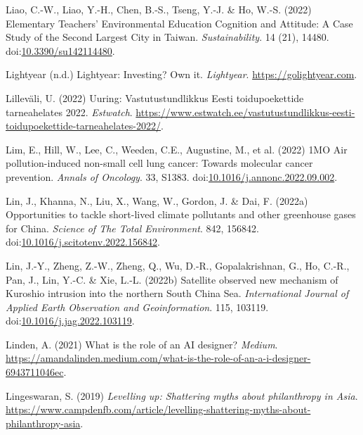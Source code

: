 \documentclass[
  letterpaper,
  DIV=11,
  numbers=noendperiod]{scrartcl}
\newlength{\cslhangindent}
\newenvironment{CSLReferences}[2] %
 {\begin{list}{}{%
  \setlength{\itemindent}{0pt}
  \setlength{\leftmargin}{0pt}
  \setlength{\parsep}{0pt}
  \ifodd #1
   \setlength{\leftmargin}{\cslhangindent}
   \setlength{\itemindent}{-1\cslhangindent}
  \fi
  \setlength{\itemsep}{#2\baselineskip}}}
 {\end{list}}
\begin{document}
\begin{CSLReferences}{0}{1}
Liao, C.-W., Liao, Y.-H., Chen, B.-S., Tseng, Y.-J. \& Ho, W.-S. (2022)
Elementary {Teachers}' {Environmental Education Cognition} and
{Attitude}: {A Case Study} of the {Second Largest City} in {Taiwan}.
\emph{Sustainability}. 14 (21), 14480.
doi:\href{https://doi.org/10.3390/su142114480}{10.3390/su142114480}.

Lightyear (n.d.) Lightyear: {Investing}? {Own} it. \emph{Lightyear}.
\url{https://golightyear.com}.

Lilleväli, U. (2022) Uuring: {Vastutustundlikkus Eesti} toidupoekettide
tarneahelates 2022. \emph{Estwatch}.
\url{https://www.estwatch.ee/vastutustundlikkus-eesti-toidupoekettide-tarneahelates-2022/}.

Lim, E., Hill, W., Lee, C., Weeden, C.E., Augustine, M., et al. (2022)
{1MO Air} pollution-induced non-small cell lung cancer: {Towards}
molecular cancer prevention. \emph{Annals of Oncology}. 33, S1383.
doi:\href{https://doi.org/10.1016/j.annonc.2022.09.002}{10.1016/j.annonc.2022.09.002}.

Lin, J., Khanna, N., Liu, X., Wang, W., Gordon, J. \& Dai, F. (2022a)
Opportunities to tackle short-lived climate pollutants and other
greenhouse gases for {China}. \emph{Science of The Total Environment}.
842, 156842.
doi:\href{https://doi.org/10.1016/j.scitotenv.2022.156842}{10.1016/j.scitotenv.2022.156842}.

Lin, J.-Y., Zheng, Z.-W., Zheng, Q., Wu, D.-R., Gopalakrishnan, G., Ho,
C.-R., Pan, J., Lin, Y.-C. \& Xie, L.-L. (2022b) Satellite observed new
mechanism of {Kuroshio} intrusion into the northern {South China Sea}.
\emph{International Journal of Applied Earth Observation and
Geoinformation}. 115, 103119.
doi:\href{https://doi.org/10.1016/j.jag.2022.103119}{10.1016/j.jag.2022.103119}.

Linden, A. (2021) What is the role of an {AI} designer? \emph{Medium}.
\url{https://amandalinden.medium.com/what-is-the-role-of-an-a-i-designer-6943711046ec}.

Lingeswaran, S. (2019) \emph{Levelling up: {Shattering} myths about
philanthropy in {Asia}}.
\url{https://www.campdenfb.com/article/levelling-shattering-myths-about-philanthropy-asia}.


\end{CSLReferences}
\end{document}
